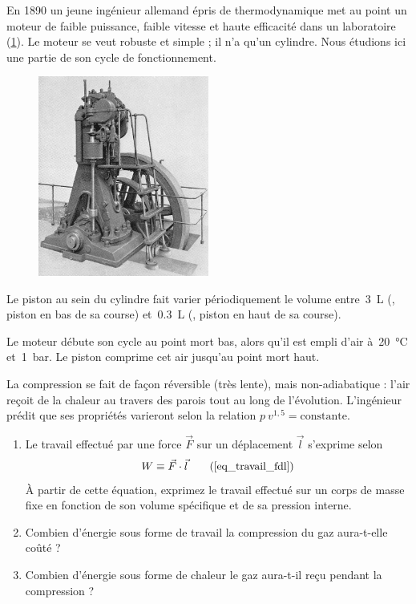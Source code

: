 	En 1890 un jeune ingénieur allemand épris de thermodynamique met au point un moteur de faible puissance, faible vitesse et haute efficacité dans un laboratoire (\cref{fig_exo_moteur_diesel}). Le moteur se veut robuste et simple ; il n’a qu’un cylindre. Nous étudions ici une partie de son cycle de fonctionnement. %
	
	\begin{figure}
		\begin{center}
			\includegraphics[width=0.5\textwidth]{images/Dieselmotor_1898_retouched.jpg}
		\end{center}
		\label{fig_exo_moteur_diesel}
	\end{figure}
	
	Le piston au sein du cylindre fait varier périodiquement le volume entre~\SI{3}{\liter} (, piston en bas de sa course) et~\SI{0,3}{\liter} (, piston en haut de sa course).
	
	Le moteur débute son cycle au point mort bas, alors qu’il est empli d’air à~\SI{20}{\degreeCelsius} et~\SI{1}{\bar}. Le piston comprime cet air jusqu’au point mort haut.
	
	La compression se fait de façon réversible (très lente), mais non-adiabatique : l’air reçoit de la chaleur au travers des parois tout au long de l’évolution. L’ingénieur prédit que ses propriétés varieront selon la relation $p \ v^{1,5} = \text{constante}$.


	\begin{enumerate}
		\item Le travail effectué par une force $\vec F$ sur un déplacement $\vec l$ s’exprime selon
			\begin{equation}
				W \equiv \vec F \cdot \vec l 	\tag{\ref{eq_travail_fdl}}
			\end{equation}
			À partir de cette équation, exprimez le travail effectué sur un corps de masse fixe en fonction de son volume spécifique et de sa pression interne.
		\item Combien d’énergie sous forme de travail la compression du gaz aura-t-elle coûté ?
		\item Combien d’énergie sous forme de chaleur le gaz aura-t-il reçu pendant la compression ?
	\end{enumerate}

